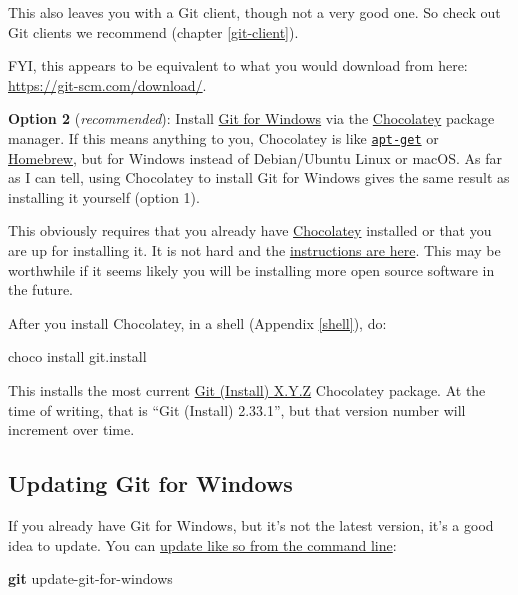 \documentclass[
]{book}
\newenvironment{Shaded}{\begin{snugshade}}{\end{snugshade}}
\newcommand{\ExtensionTok}[1]{#1}
\newcommand{\FunctionTok}[1]{\textcolor[rgb]{0.13,0.29,0.53}{\textbf{#1}}}
\newcommand{\NormalTok}[1]{#1}
\begin{document}
This also leaves you with a Git client, though not a very good one. So check out Git clients we recommend (chapter \ref{git-client}).

FYI, this appears to be equivalent to what you would download from here: \url{https://git-scm.com/download/}.

\textbf{Option 2} (\emph{recommended}): Install \href{https://git-for-windows.github.io/}{Git for Windows} via the \href{https://chocolatey.org}{Chocolatey} package manager. If this means anything to you, Chocolatey is like \href{https://en.wikipedia.org/wiki/APT_(Debian)}{\texttt{apt-get}} or \href{https://brew.sh}{Homebrew}, but for Windows instead of Debian/Ubuntu Linux or macOS. As far as I can tell, using Chocolatey to install Git for Windows gives the same result as installing it yourself (option 1).

This obviously requires that you already have \href{https://chocolatey.org}{Chocolatey} installed or that you are up for installing it. It is not hard and the \href{https://chocolatey.org/install}{instructions are here}. This may be worthwhile if it seems likely you will be installing more open source software in the future.

After you install Chocolatey, in a shell (Appendix \ref{shell}), do:

\begin{Shaded}
\begin{Highlighting}[]
\ExtensionTok{choco}\NormalTok{ install git.install}
\end{Highlighting}
\end{Shaded}

This installs the most current \href{https://chocolatey.org/packages/git.install}{Git (Install) X.Y.Z} Chocolatey package. At the time of writing, that is ``Git (Install) 2.33.1'', but that version number will increment over time.

\subsection{Updating Git for Windows}\label{updating-git-for-windows}

If you already have Git for Windows, but it's not the latest version, it's a good idea to update.
You can \href{https://github.com/git-for-windows/git/wiki/FAQ\#how-do-i-update-git-for-windows-upon-new-releases}{update like so from the command line}:

\begin{Shaded}
\begin{Highlighting}[]
\FunctionTok{git}\NormalTok{ update{-}git{-}for{-}windows}
\end{Highlighting}
\end{Shaded}
\end{document}
